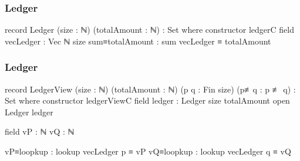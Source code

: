 \documentclass{beamer}
\begin{document}

\begin{frame}
  \frametitle{Ledger}
\begin{code}
record Ledger (size : ℕ) (totalAmount : ℕ) : Set where
  constructor ledgerC
  field
    vecLedger       : Vec ℕ size
    sum≡totalAmount : sum vecLedger ≡ totalAmount
\end{code}
\end{frame}

\begin{frame}
  \frametitle{Ledger}
\begin{code}
record LedgerView (size : ℕ) (totalAmount : ℕ)
  (p q : Fin size) (p≢q : p ≢ q) : Set where
  constructor ledgerViewC
  field
    ledger : Ledger size totalAmount
  open Ledger ledger

  field
    vP : ℕ
    vQ : ℕ

    vP≡loopkup : lookup vecLedger p ≡ vP
    vQ≡loopkup : lookup vecLedger q ≡ vQ
\end{code}
\end{frame}
\end{document}
